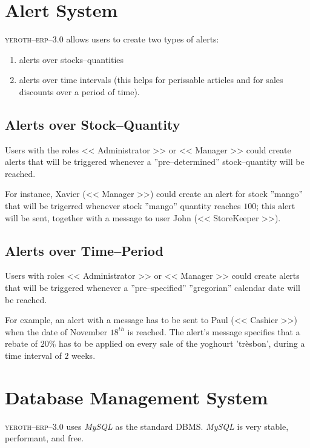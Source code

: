 \documentclass[a4paper, 10pt, twocolumn]{article}
\newcommand{\yeren}{\textsc{yeroth--erp--3.0}\xspace}
\newcommand{\administrator}{<< Administrator >>\xspace}
\newcommand{\manager}{<< Manager >>\xspace}
\newcommand{\storekeeper}{<< StoreKeeper >>\xspace}
\newcommand{\cashier}{<< Cashier >>\xspace}
\begin{document}
\vspace{-1.2em}
\section{Alert System}
\vspace{-0.3em}
\yeren allows users to create two types of alerts:
\begin{enumerate}[1)]
	\itemsep -0.5em
  \item alerts over stocks--quantities
  \item alerts over time intervals (this helps for
	  perissable articles and for sales discounts
	  over a period of time).
\end{enumerate}

\vspace{-1.1em}
\subsection{Alerts over Stock--Quantity}
\vspace{0em}
Users with the roles \administrator or \manager
could create alerts that will be triggered
whenever a ''pre--determined'' stock--quantity
will be reached.

For instance, Xavier (\manager) could create
an alert for stock ''mango'' that will be
trigerred whenever stock ''mango'' quantity
reaches $100$; this alert will be sent,
together with a message to user John (\storekeeper).

\vspace{-1.1em}
\subsection{Alerts over Time--Period}
\vspace{0em}
Users with roles \administrator or \manager
could create alerts that will be triggered
whenever a ''pre--specified'' ''gregorian''
calendar date will be reached.

For example, an alert with a message has to be
sent to Paul (\cashier) when the date of November
$18^{th}$ is reached. The alert's message
specifies that a rebate of $20\%$ has to be applied
on every sale of the yoghourt 'tr\`esbon', during a
time interval of $2$ weeks.

\vspace{-1.5em}
\section{Database Management System}
\vspace{-0.9em}
\yeren uses \emph{MySQL} as the standard DBMS. 
\emph{MySQL} is very stable, performant, and
free.
\end{document}
